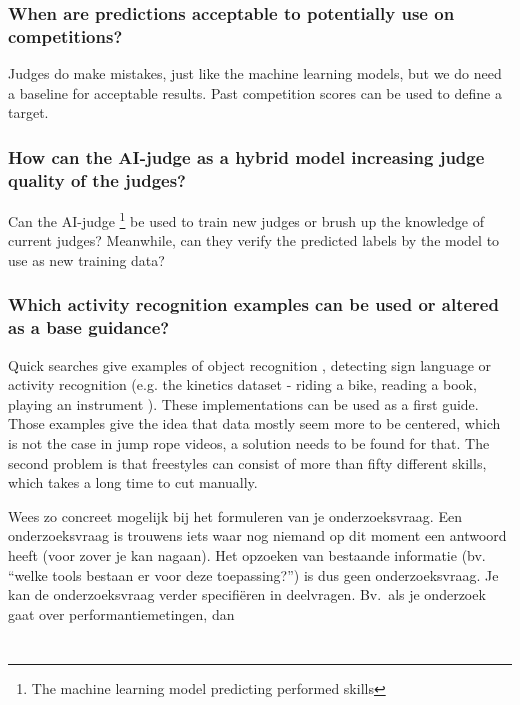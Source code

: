 \subsubsection{When are predictions acceptable to potentially use on competitions?}
\label{subsubsec:intro-question-acceptable-results}

Judges do make mistakes, just like the machine learning models, but we do need a baseline for acceptable results. Past competition scores can be used to define a target.

\subsubsection{How can the AI-judge as a hybrid model increasing judge quality of the judges?}
\label{subsubsec:intro-question-hybrid-model-judge-quality}
Can the AI-judge \footnote{The machine learning model predicting performed skills} be used to train new judges or brush up the knowledge of current judges? Meanwhile, can they verify the predicted labels by the model to use as new training data?

\subsubsection{Which activity recognition examples can be used or altered as a base guidance?}
\label{subsubsec:intro-question-earlier-research-guidance}

Quick searches give examples of object recognition \autocite{Diwaker_2022}, detecting sign language \autocite{Bora_2023} or activity recognition (e.g. the kinetics dataset - riding a bike, reading a book, playing an instrument \autocite{Kay_2017}).
These implementations can be used as a first guide.
Those examples give the idea that data mostly seem more to be centered, which is not the case in jump rope videos, a solution needs to be found for that. The second problem is that freestyles can consist of more than fifty different skills, which takes a long time to cut manually.


Wees zo concreet mogelijk bij het formuleren van je onderzoeksvraag. Een onderzoeksvraag is trouwens iets waar nog niemand op dit moment een antwoord heeft (voor zover je kan nagaan). Het opzoeken van bestaande informatie (bv. ``welke tools bestaan er voor deze toepassing?'') is dus geen onderzoeksvraag. Je kan de onderzoeksvraag verder specifiëren in deelvragen. Bv.~als je onderzoek gaat over performantiemetingen, dan

\section{}%
\label{sec:onderzoeksdoelstelling}

